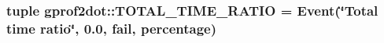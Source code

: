 \label{namespacegprof2dot_a3b63ba497b1ebe0c63064d7c77123930}
\hypertarget{namespacegprof2dot_a09afab61d414ac377c75fc45a6ea503e}{
\subsubsection[{TOTAL\_\-TIME\_\-RATIO}]{\setlength{\rightskip}{0pt plus 5cm}tuple {\bf gprof2dot::TOTAL\_\-TIME\_\-RATIO} = {\bf Event}(\char`\"{}Total time ratio\char`\"{}, 0.0, fail, percentage)}}
\label{namespacegprof2dot_a09afab61d414ac377c75fc45a6ea503e}
